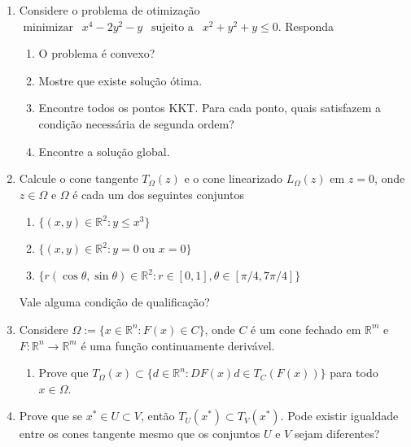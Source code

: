 \documentclass[a4paper,latin]{article}
\begin{document}
\begin{enumerate}
    {\it Dica: } Re-escreva o problema 
    $
    \underset{x \in \Delta(n)}{\text{minimizar}} \ \ 
    \text{max}\{ \langle a_{i}, x\rangle : i=1, \dots, m \} 
    $
    como 
    $
    \underset{x \in \Delta(n), v }{\text{minimizar}} \ \ 
    v \ \ \text{ s.a. } \langle a_{i}, x\rangle \leq v, \ \ 
    \forall i
    $, e aplique dualidade neste último problema. 
    \item Considere o problema de otimização  
     $ 
     \text{ minimizar } \ \  x^4-2y^2-y \ \ 
     \text{ sujeito a } \ \ x^2+y^2+y \leq 0 
     $.
     Responda
         \begin{enumerate}
         	\item O problema é convexo?
         	\item Mostre que existe solução ótima.
         	\item Encontre todos os pontos KKT. Para cada ponto,  quais satisfazem a condição necessária de segunda ordem?
         	\item Encontre a solução global.  
         \end{enumerate} 
    \item Calcule o cone tangente 
    $T_{\Omega}(z)$ e o cone linearizado 
    $L_{\Omega}(z)$ em $z=0$, onde $z \in \Omega$ e $\Omega$ é cada um dos seguintes conjuntos
    \begin{enumerate}
    \item 
    $\{(x,y) \in \mathbb{R}^2:
    y \leq x^3\}$
    \item 
    $\{(x,y) \in \mathbb{R}^2:
    y=0 \text{ ou } x=0 \}$
    \item 
    $\{r(\cos \theta , \sin \theta) \in \mathbb{R}^2:
    r \in [0,1], \theta \in [\pi/4, 7 \pi/4]\}$
    \end{enumerate}
   Vale alguma condição de qualificação?
    \item Considere
 $\Omega:=\{x \in \mathbb{R}^n: 
 F(x) \in C \}$, onde   
 $C$ é um cone fechado em $\mathbb{R}^m$ e
 $F:\mathbb{R}^n \rightarrow \mathbb{R}^m$ é uma função continuamente derivável. 
  \begin{enumerate}
  	\item Prove que 
  	$T_{\Omega}(x)
  	\subset
  	\{ d \in \mathbb{R}^n:
    DF(x)d \in 
    T_{C}(F(x))\}$ 
    para todo
    $x \in \Omega$.
  \end{enumerate}
  \item Prove que se $x^* \in U \subset V$, então $T_{U}(x^*) \subset T_{V}(x^*)$. Pode existir igualdade entre os cones tangente mesmo que os conjuntos $U$ e $V$ sejam diferentes?

\end{enumerate}
\end{document}

